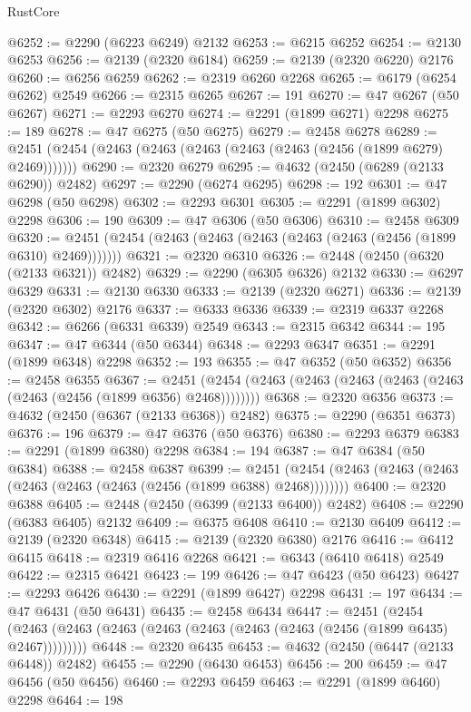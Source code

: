 \begin{lexlean}{RustCore}
\begin{coremodule}
@6252 := @2290 (@6223 @6249) @2132
@6253 := @6215 @6252
@6254 := @2130 @6253
@6256 := @2139 (@2320 @6184)
@6259 := @2139 (@2320 @6220) @2176
@6260 := @6256 @6259
@6262 := @2319 @6260 @2268
@6265 := @6179 (@6254 @6262) @2549
@6266 := @2315 @6265
@6267 := 191
@6270 := @47 @6267 (@50 @6267)
@6271 := @2293 @6270
@6274 := @2291 (@1899 @6271) @2298
@6275 := 189
@6278 := @47 @6275 (@50 @6275)
@6279 := @2458 @6278
@6289 := @2451 (@2454 (@2463 (@2463 (@2463 (@2463 (@2463 (@2456 (@1899 @6279) @2469)))))))
@6290 := @2320 @6279
@6295 := @4632 (@2450 (@6289 (@2133 @6290)) @2482)
@6297 := @2290 (@6274 @6295)
@6298 := 192
@6301 := @47 @6298 (@50 @6298)
@6302 := @2293 @6301
@6305 := @2291 (@1899 @6302) @2298
@6306 := 190
@6309 := @47 @6306 (@50 @6306)
@6310 := @2458 @6309
@6320 := @2451 (@2454 (@2463 (@2463 (@2463 (@2463 (@2463 (@2456 (@1899 @6310) @2469)))))))
@6321 := @2320 @6310
@6326 := @2448 (@2450 (@6320 (@2133 @6321)) @2482)
@6329 := @2290 (@6305 @6326) @2132
@6330 := @6297 @6329
@6331 := @2130 @6330
@6333 := @2139 (@2320 @6271)
@6336 := @2139 (@2320 @6302) @2176
@6337 := @6333 @6336
@6339 := @2319 @6337 @2268
@6342 := @6266 (@6331 @6339) @2549
@6343 := @2315 @6342
@6344 := 195
@6347 := @47 @6344 (@50 @6344)
@6348 := @2293 @6347
@6351 := @2291 (@1899 @6348) @2298
@6352 := 193
@6355 := @47 @6352 (@50 @6352)
@6356 := @2458 @6355
@6367 := @2451 (@2454 (@2463 (@2463 (@2463 (@2463 (@2463 (@2463 (@2456 (@1899 @6356) @2468))))))))
@6368 := @2320 @6356
@6373 := @4632 (@2450 (@6367 (@2133 @6368)) @2482)
@6375 := @2290 (@6351 @6373)
@6376 := 196
@6379 := @47 @6376 (@50 @6376)
@6380 := @2293 @6379
@6383 := @2291 (@1899 @6380) @2298
@6384 := 194
@6387 := @47 @6384 (@50 @6384)
@6388 := @2458 @6387
@6399 := @2451 (@2454 (@2463 (@2463 (@2463 (@2463 (@2463 (@2463 (@2456 (@1899 @6388) @2468))))))))
@6400 := @2320 @6388
@6405 := @2448 (@2450 (@6399 (@2133 @6400)) @2482)
@6408 := @2290 (@6383 @6405) @2132
@6409 := @6375 @6408
@6410 := @2130 @6409
@6412 := @2139 (@2320 @6348)
@6415 := @2139 (@2320 @6380) @2176
@6416 := @6412 @6415
@6418 := @2319 @6416 @2268
@6421 := @6343 (@6410 @6418) @2549
@6422 := @2315 @6421
@6423 := 199
@6426 := @47 @6423 (@50 @6423)
@6427 := @2293 @6426
@6430 := @2291 (@1899 @6427) @2298
@6431 := 197
@6434 := @47 @6431 (@50 @6431)
@6435 := @2458 @6434
@6447 := @2451
    (@2454 (@2463 (@2463 (@2463 (@2463 (@2463 (@2463 (@2463 (@2456 (@1899 @6435) @2467)))))))))
@6448 := @2320 @6435
@6453 := @4632 (@2450 (@6447 (@2133 @6448)) @2482)
@6455 := @2290 (@6430 @6453)
@6456 := 200
@6459 := @47 @6456 (@50 @6456)
@6460 := @2293 @6459
@6463 := @2291 (@1899 @6460) @2298
@6464 := 198

\end{coremodule}
\end{lexlean}
